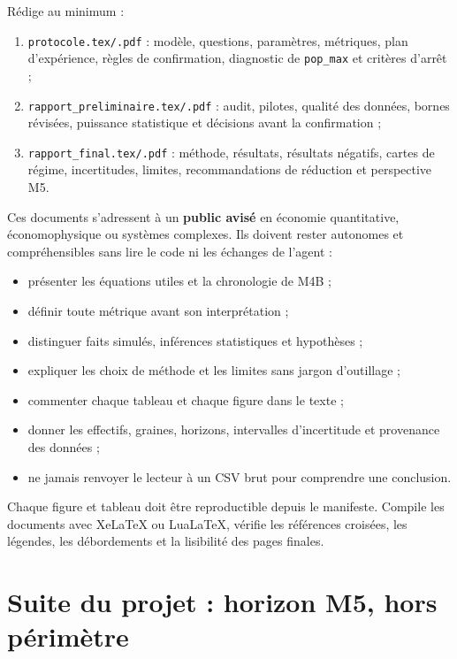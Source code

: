 \documentclass[11pt,a4paper]{article}
\newcommand{\code}[1]{\texttt{\color{navy}#1}}
\newcommand{\term}[1]{\textbf{\color{navy}#1}}
\begin{document}
Rédige au minimum :

\begin{enumerate}
  \item \code{protocole.tex/.pdf} : modèle, questions, paramètres, métriques,
    plan d'expérience, règles de confirmation, diagnostic de \code{pop\_max}
    et critères d'arrêt ;
  \item \code{rapport\_preliminaire.tex/.pdf} : audit, pilotes, qualité des
    données, bornes révisées, puissance statistique et décisions avant la
    confirmation ;
  \item \code{rapport\_final.tex/.pdf} : méthode, résultats, résultats
    négatifs, cartes de régime, incertitudes, limites, recommandations de
    réduction et perspective M5.
\end{enumerate}

Ces documents s'adressent à un \term{public avisé} en économie quantitative,
économophysique ou systèmes complexes. Ils doivent rester autonomes et
compréhensibles sans lire le code ni les échanges de l'agent :

\begin{itemize}
  \item présenter les équations utiles et la chronologie de M4B ;
  \item définir toute métrique avant son interprétation ;
  \item distinguer faits simulés, inférences statistiques et hypothèses ;
  \item expliquer les choix de méthode et les limites sans jargon d'outillage ;
  \item commenter chaque tableau et chaque figure dans le texte ;
  \item donner les effectifs, graines, horizons, intervalles d'incertitude et
    provenance des données ;
  \item ne jamais renvoyer le lecteur à un CSV brut pour comprendre une
    conclusion.
\end{itemize}

Chaque figure et tableau doit être reproductible depuis le manifeste. Compile
les documents avec XeLaTeX ou LuaLaTeX, vérifie les références croisées, les
légendes, les débordements et la lisibilité des pages finales.

\section{Suite du projet : horizon M5, hors périmètre}
\end{document}
